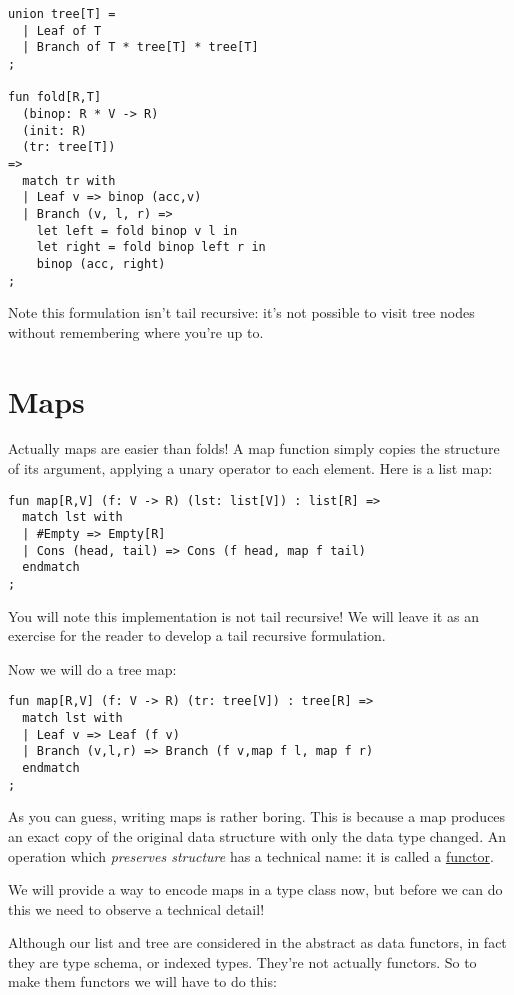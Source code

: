 \documentclass[oneside]{book}
\begin{document}
\begin{verbatim}
union tree[T] =
  | Leaf of T
  | Branch of T * tree[T] * tree[T]
;

fun fold[R,T]
  (binop: R * V -> R)
  (init: R)
  (tr: tree[T])
=>
  match tr with
  | Leaf v => binop (acc,v)
  | Branch (v, l, r) =>
    let left = fold binop v l in
    let right = fold binop left r in
    binop (acc, right)
;
\end{verbatim}

Note this formulation isn't tail recursive: it's not possible
to visit tree nodes without remembering where you're up to.

\section{Maps}
Actually maps are easier than folds! A map function simply
copies the structure of its argument, applying a unary operator
to each element. Here is a list map:

\begin{verbatim}
fun map[R,V] (f: V -> R) (lst: list[V]) : list[R] =>
  match lst with
  | #Empty => Empty[R]
  | Cons (head, tail) => Cons (f head, map f tail)
  endmatch
;
\end{verbatim}

You will note this implementation is not tail recursive!
We will leave it as an exercise for the reader to 
develop a tail recursive formulation.

Now we will do a tree map:

\begin{verbatim}
fun map[R,V] (f: V -> R) (tr: tree[V]) : tree[R] =>
  match lst with
  | Leaf v => Leaf (f v)
  | Branch (v,l,r) => Branch (f v,map f l, map f r)
  endmatch
;
\end{verbatim}

As you can guess, writing maps is rather boring.
This is because a map produces an exact copy of the
original data structure with only the data type changed.
An operation which {\em preserves structure} has a technical
name: it is called a \href{https://en.wikipedia.org/wiki/Functor}{functor}.

We will provide a way to encode maps in a type class now,
but before we can do this we need to observe a technical detail!

Although our list and tree are considered in the abstract as
data functors, in fact they are type schema, or indexed types.
They're not actually functors. So to make them functors we
will have to do this:
\end{document}
